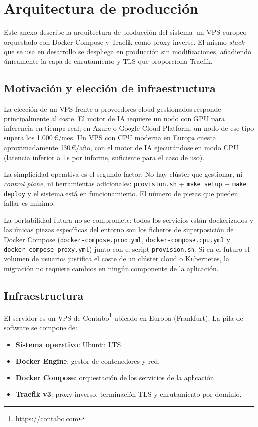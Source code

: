 \chapter{Arquitectura de producción}
\label{cap:AnexoI}

Este anexo describe la arquitectura de producción del sistema: un VPS europeo orquestado con Docker Compose y Traefik como proxy inverso. El mismo \emph{stack} que se usa en desarrollo se despliega en producción sin modificaciones, añadiendo únicamente la capa de enrutamiento y TLS que proporciona Traefik.

\section{Motivación y elección de infraestructura}

La elección de un VPS frente a proveedores cloud gestionados responde principalmente al coste. El motor de IA requiere un nodo con GPU para inferencia en tiempo real; en Azure o Google Cloud Platform, un nodo de ese tipo supera los 1.000\,€/mes. Un VPS con CPU moderna en Europa cuesta aproximadamente 130\,€/año, con el motor de IA ejecutándose en modo CPU (latencia inferior a 1\,s por informe, suficiente para el caso de uso).

La simplicidad operativa es el segundo factor. No hay clúster que gestionar, ni \emph{control plane}, ni herramientas adicionales: \texttt{provision.sh} + \texttt{make setup} + \texttt{make deploy} y el sistema está en funcionamiento. El número de piezas que pueden fallar es mínimo.

La portabilidad futura no se compromete: todos los servicios están dockerizados y las únicas piezas específicas del entorno son los ficheros de superposición de Docker Compose (\texttt{docker-compose.prod.yml}, \texttt{docker-compose.cpu.yml} y \texttt{docker-compose-proxy.yml}) junto con el script \texttt{provision.sh}. Si en el futuro el volumen de usuarios justifica el coste de un clúster cloud o Kubernetes, la migración no requiere cambios en ningún componente de la aplicación.

\section{Infraestructura}

El servidor es un VPS de Contabo\footnote{\url{https://contabo.com}} ubicado en Europa (Frankfurt). La pila de software se compone de:

\begin{itemize}
    \item \textbf{Sistema operativo}: Ubuntu LTS.
    \item \textbf{Docker Engine}: gestor de contenedores y red.
    \item \textbf{Docker Compose}: orquestación de los servicios de la aplicación.
    \item \textbf{Traefik v3}: proxy inverso, terminación TLS y enrutamiento por dominio.
\end{itemize}

